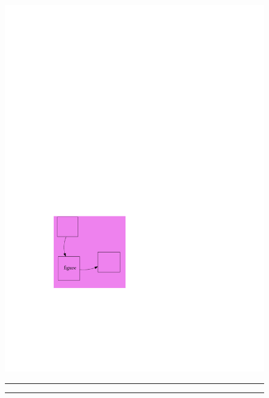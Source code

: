 \documentclass[a4paper,12pt]{memoir}
\begin{document}
\begin{figure}%
  \noindent
  \begin{minipage}{0.5\textwidth}%
    \rule{0pt}{1pt}\par
    \noindent\includegraphics[scale=1,page=1]{myfigure.pdf}\par
    \rule{\linewidth}{1pt}\par
  \end{minipage}%
  \begin{minipage}{0.5\textwidth}%
    \rule{\linewidth}{1pt}\par

\end{minipage}
\end{figure}
\end{document}
